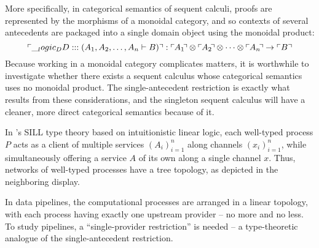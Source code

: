 \begin{description}[parsep=0pt, listparindent=\parindent]
  More specifically, in categorical semantics of sequent calculi, proofs are represented by the morphisms of a monoidal category, and so contexts of several antecedents are packaged into a single domain object using the monoidal product:
  \begin{equation*}
    \ulcorner \DD :: (A_1, A_2, \dotsc, A_n \vdash B) \urcorner :
      \ulcorner\mkern-1mu A_1 \mkern-\thinmuskip\urcorner \otimes \ulcorner\mkern-1mu A_2 \mkern-\thinmuskip\urcorner \otimes \dotsb \otimes \ulcorner\mkern-1mu A_n \mkern-\thinmuskip\urcorner \to \ulcorner B \urcorner
  \end{equation*}
  Because working in a monoidal category complicates matters, it is worthwhile to investigate whether there exists a sequent calculus whose categorical semantics uses no monoidal product.
  The single-antecedent restriction is exactly what results from these considerations, and the singleton sequent calculus will have a cleaner, more direct categorical semantics because of it.

\item[Type theory]
  In \citeauthor{??}'s SILL type theory based on intuitionistic linear logic, each well-typed process $P$ acts as a client of multiple services $(A_i)_{i=1}^n$ along channels $(x_i)_{i=1}^n$, while simultaneously offering a service $A$ of its own along a single channel $x$.
  Thus, networks of well-typed processes have a tree topology, as depicted in the neighboring display.%

  In data pipelines, the computational processes are arranged in a linear topology, with each process having exactly one upstream provider -- no more and no less.
  To study pipelines, a \enquote{single-provider restriction} is needed -- a type-theoretic analogue of the single-antecedent restriction.
\end{description}


